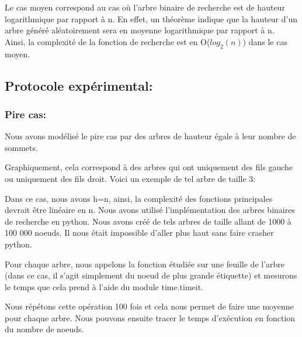 \documentclass{report}
\begin{document}
Le cas moyen correspond au cas où l'arbre binaire de recherche est de hauteur logarithmique par rapport à n. En effet, un théorème indique que la hauteur d'un arbre généré aléatoirement sera en moyenne logarithmique par rapport à n. \cite{hauteur} \\
Ainsi, la complexité de la fonction de recherche est en O($log_2(n)$) dans le cas moyen.

\subsection{Protocole expérimental:}

\subsubsection{Pire cas:}
Nous avons modélisé le pire cas par des arbres de hauteur égale à leur nombre de sommets.

Graphiquement, cela correspond à des arbres qui ont uniquement des fils gauche ou uniquement des fils droit. Voici un exemple de tel arbre de taille 3:

\begin{center}
\end{center}

Dans ce cas, nous avons h=n, ainsi, la complexité des fonctions principales devrait être linéaire en n. \newline \newline
Nous avons utilisé l'implémentation des arbres binaires de recherche en python.
Nous avons créé de tels arbres de taille allant de 1000 à 100 000 noeuds. Il nous était impossible d'aller plus haut sans faire crasher python.

Pour chaque arbre, nous appelons la fonction étudiée sur une feuille de l'arbre (dans ce cas, il s'agit simplement du noeud de plus grande étiquette) et mesurons le temps que cela prend à l'aide du module time.timeit. 

Nous répétons cette opération 100 fois et cela nous permet de faire une moyenne pour chaque arbre. Nous pouvons ensuite tracer le temps d'exécution en fonction du nombre de noeuds.
\end{document}
